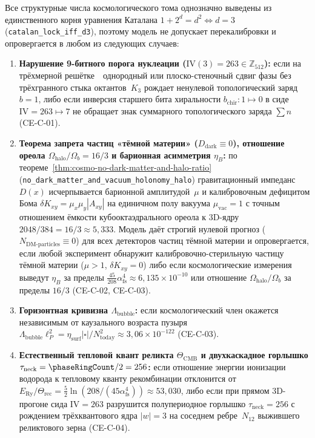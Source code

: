 Все структурные числа космологического тома однозначно выведены из единственного корня уравнения Каталана $1+2^d=d^2 \iff d=3$ (\texttt{catalan\_\allowbreak lock\_\allowbreak iff\_\allowbreak d3}), поэтому модель не допускает перекалибровки и опровергается в любом из следующих случаев:
\begin{enumerate}[leftmargin=*]
\item \textbf{Нарушение 9-битного порога нуклеации ($\mathrm{IV}(3)=263\in\mathbb{Z}_{512}$):}
  если на трёхмерной решётке~\latGCKshort\ однородный или плоско-стеночный сдвиг фазы без трёхгранного стыка октантов~$K_3$ рождает ненулевой топологический заряд $b=1$, либо если инверсия старшего бита хиральности $b_{\mathrm{chir}}\colon 1\mapsto 0$ в сиде $\mathrm{IV}=263\mapsto 7$ не обращает знак суммарного топологического заряда $\sum n$ (CE-C-01).
\item \textbf{Теорема запрета частиц «тёмной материи» ($D_{\mathrm{dark}}\equiv 0$), отношение ореола $\Omega_{\mathrm{halo}}/\Omega_b = 16/3$ и барионная асимметрия $\eta_B$:}
  по теореме~\ref{thm:cosmo-no-dark-matter-and-halo-ratio} (\texttt{no\_\allowbreak dark\_\allowbreak matter\_\allowbreak and\_\allowbreak vacuum\_\allowbreak holonomy\_\allowbreak halo}) гравитационный импеданс $D(x)$ исчерпывается барионной амплитудой~$\mu$ и калибровочным дефицитом Бома $\delta K_{xy}=\mu_x\mu_y|A_{xy}|$ на единичном полу вакуума $\mu_{\mathrm{vac}}=1$ с точным отношением ёмкости кубооктаэдрального ореола к $3\mathrm{D}$-ядру $2048/384 = 16/3 \approx 5{,}333$. Модель даёт строгий нулевой прогноз ($N_{\mathrm{DM\text{-}particles}}\equiv 0$) для всех детекторов частиц тёмной материи и опровергается, если любой эксперимент обнаружит калибровочно-стерильную частицу тёмной материи ($\mu>1$, $\delta K_{xy}=0$) либо если космологические измерения выведут $\eta_B$ за пределы $\frac{45}{208}\alpha_{\mathrm{fs}}^4 \approx 6{,}135\times 10^{-10}$ или отношение $\Omega_{\mathrm{halo}}/\Omega_b$ за пределы $16/3$ (CE-C-02, CE-C-03).
\item \textbf{Горизонтная кривизна $\Lambda_{\mathrm{bubble}}$:}
  если космологический член окажется независимым от каузального возраста пузыря $\Lambda_{\mathrm{bubble}}\ell_P^2 = \eta_{\mathrm{surf}}|\square|/N_{\mathrm{today}}^2 \approx 3{,}06\times 10^{-122}$ (CE-C-03).
\item \textbf{Естественный тепловой квант реликта $\Theta_{\mathrm{CMB}}$ и двухкаскадное горлышко $\tau_{\mathrm{neck}} = \phaseRingCount/2 = 256$:}
  если отношение энергии ионизации водорода к тепловому кванту рекомбинации отклонится от $E_{\mathrm{Ry}}/\Theta_{\mathrm{rec}} = \frac{5}{2}\ln(208/(45\alpha_{\mathrm{fs}}^4)) \approx 53{,}030$, либо если при прямом 3D-прогоне сида $\mathrm{IV}=263$ разрушится полупериодное горлышко $\tau_{\mathrm{neck}}=256$ с рождением трёхквантового ядра $|w|=3$ на соседнем ребре~$N_{12}$ выжившего реликтового зерна (CE-C-04).
\end{enumerate}
